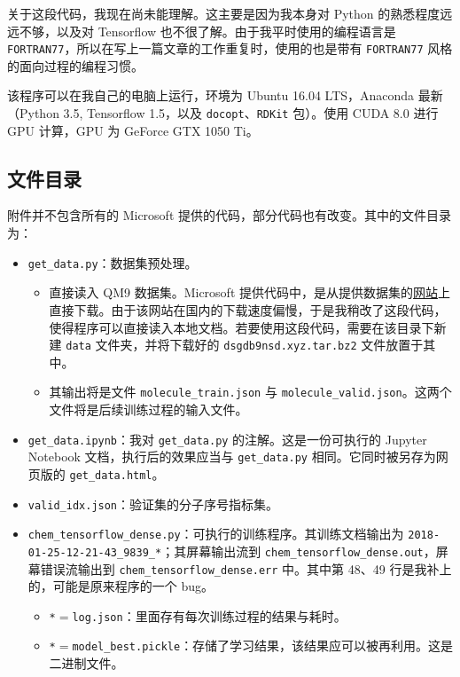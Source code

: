 \documentclass[10pt,a4paper,onecolumn]{article}
\numberwithin{equation}{section}
\begin{document}
关于这段代码，我现在尚未能理解。这主要是因为我本身对 Python 的熟悉程度远远不够，以及对 Tensorflow 也不很了解。由于我平时使用的编程语言是 \verb|FORTRAN77|，所以在写上一篇文章的工作重复时，使用的也是带有 \verb|FORTRAN77| 风格的面向过程的编程习惯。

该程序可以在我自己的电脑上运行，环境为 Ubuntu 16.04 LTS，Anaconda 最新（Python 3.5, Tensorflow 1.5，以及 \verb|docopt|、\verb|RDKit| 包）。使用 CUDA 8.0 进行 GPU 计算，GPU 为 GeForce GTX 1050 Ti。

\subsection{文件目录}

附件并不包含所有的 Microsoft 提供的代码，部分代码也有改变。其中的文件目录为：
\begin{itemize}[noitemsep]
  \item \verb|get_data.py|：数据集预处理。
    \begin{itemize}[noitemsep, nolistsep]
      \item 直接读入 QM9 数据集。Microsoft 提供代码中，是从提供数据集的\href{https://ndownloader.figshare.com/files/3195389}{网站}上直接下载。由于该网站在国内的下载速度偏慢，于是我稍改了这段代码，使得程序可以直接读入本地文档。若要使用这段代码，需要在该目录下新建 \verb|data| 文件夹，并将下载好的 \verb|dsgdb9nsd.xyz.tar.bz2| 文件放置于其中。
      \item 其输出将是文件 \verb|molecule_train.json| 与 \verb|molecule_valid.json|。这两个文件将是后续训练过程的输入文件。
    \end{itemize}
  \item \verb|get_data.ipynb|：我对 \verb|get_data.py| 的注解。这是一份可执行的 Jupyter Notebook 文档，执行后的效果应当与 \verb|get_data.py| 相同。它同时被另存为网页版的 \verb|get_data.html|。
  \item \verb|valid_idx.json|：验证集的分子序号指标集。
  \item \verb|chem_tensorflow_dense.py|：可执行的训练程序。其训练文档输出为 \verb|2018-01-25-12-21-43_9839_*|；其屏幕输出流到 \verb|chem_tensorflow_dense.out|，屏幕错误流输出到 \verb|chem_tensorflow_dense.err| 中。其中第 48、49 行是我补上的，可能是原来程序的一个 bug。
  \begin{itemize}[noitemsep, nolistsep]
    \item \verb|*|$ = $\verb|log.json|：里面存有每次训练过程的结果与耗时。
    \item \verb|*|$ = $\verb|model_best.pickle|：存储了学习结果，该结果应可以被再利用。这是二进制文件。

\end{itemize}
\end{itemize}
\end{document}
